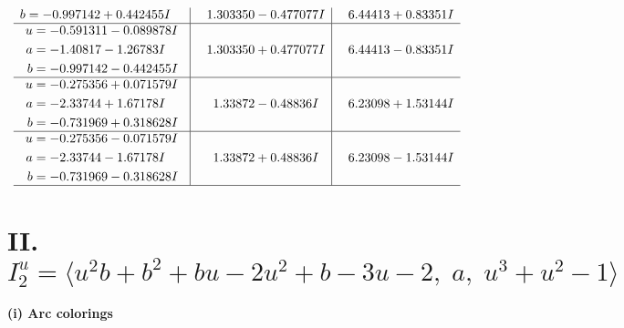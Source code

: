 \documentclass[1p]{elsarticle_modified}
\theoremstyle{definition}
\begin{document}
$$\begin{array}{c|c|c}
\begin{aligned}
b &= -0.997142 + 0.442455 I\end{aligned}
 & \phantom{-}1.303350 - 0.477077 I & \phantom{-}6.44413 + 0.83351 I \\ \hline\begin{aligned}
u &= -0.591311 - 0.089878 I \\
a &= -1.40817 - 1.26783 I \\
b &= -0.997142 - 0.442455 I\end{aligned}
 & \phantom{-}1.303350 + 0.477077 I & \phantom{-}6.44413 - 0.83351 I \\ \hline\begin{aligned}
u &= -0.275356 + 0.071579 I \\
a &= -2.33744 + 1.67178 I \\
b &= -0.731969 + 0.318628 I\end{aligned}
 & \phantom{-}1.33872 - 0.48836 I & \phantom{-}6.23098 + 1.53144 I \\ \hline\begin{aligned}
u &= -0.275356 - 0.071579 I \\
a &= -2.33744 - 1.67178 I \\
b &= -0.731969 - 0.318628 I\end{aligned}
 & \phantom{-}1.33872 + 0.48836 I & \phantom{-}6.23098 - 1.53144 I\\
 \hline 
 \end{array}$$\newpage\newpage\renewcommand{\arraystretch}{1}
\centering \section*{II. $I^u_{2}= \langle u^2 b+b^2+b u-2 u^2+b-3 u-2,\;a,\;u^3+u^2-1 \rangle$}
\flushleft \textbf{(i) Arc colorings}\\
\end{document}
